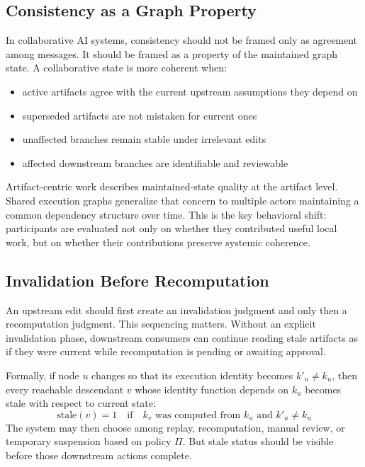\documentclass{article}
\begin{document}
\subsection{Consistency as a Graph Property}

In collaborative AI systems, consistency should not be framed only as agreement among messages. It should be framed as a property of the maintained graph state. A collaborative state is more coherent when:
\begin{itemize}
\item active artifacts agree with the current upstream assumptions they depend on
\item superseded artifacts are not mistaken for current ones
\item unaffected branches remain stable under irrelevant edits
\item affected downstream branches are identifiable and reviewable
\end{itemize}

Artifact-centric work describes maintained-state quality at the artifact level. Shared execution graphs generalize that concern to multiple actors maintaining a common dependency structure over time. This is the key behavioral shift: participants are evaluated not only on whether they contributed useful local work, but on whether their contributions preserve systemic coherence.

\subsection{Invalidation Before Recomputation}

An upstream edit should first create an invalidation judgment and only then a recomputation judgment. This sequencing matters. Without an explicit invalidation phase, downstream consumers can continue reading stale artifacts as if they were current while recomputation is pending or awaiting approval.

Formally, if node $u$ changes so that its execution identity becomes $k'_u \neq k_u$, then every reachable descendant $v$ whose identity function depends on $k_u$ becomes stale with respect to current state:
\begin{equation}
\mathrm{stale}(v) = 1 \quad \text{if} \quad k_v \text{ was computed from } k_u \text{ and } k'_u \neq k_u
\end{equation}
The system may then choose among replay, recomputation, manual review, or temporary suspension based on policy $\Pi$. But stale status should be visible before those downstream actions complete.
\end{document}
